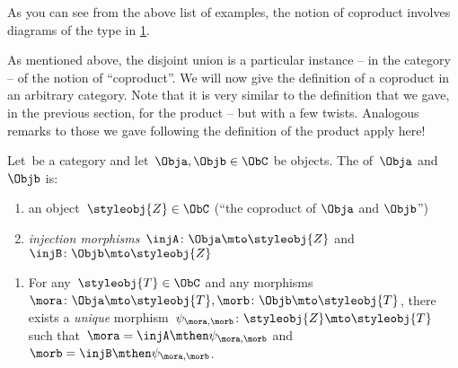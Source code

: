 
As you can see from the above list of examples, the notion of coproduct involves diagrams of the type in \cref{fig:coprod_generic}.

\begin{figure}[h!]
	\centering
	\caption{}
	\label{fig:coprod_generic}
\end{figure}

As mentioned above, the disjoint union is a particular instance -- in the category \Set  -- of the notion of ``coproduct''.
We will now give the definition of a coproduct in an arbitrary category.
Note that it is very similar to the definition that we gave, in the previous section, for the product -- but with a few twists.
Analogous remarks to those we gave following the definition of the product apply here!

\begin{ctdefinition}
	\label{def:catcoproduct}
	Let~\CatC be a category and let~$\Obja, \Objb \in \ObC$ be objects.
	The \emph{} of~$\Obja$ and~$\Objb$ is:  \\
	\constit
	\begin{enumerate}
		\item an object~$\styleobj{Z} \in \ObC$ (``the coproduct of $\Obja$ and $\Objb$'')
		\item \emph{injection morphisms}~$\injA \colon \Obja \mto \styleobj{Z} $ and~$\injB \colon \Objb \mto \styleobj{Z} $
	\end{enumerate}
	\condit
	\begin{enumerate}
		\item For any~$\styleobj{T} \in \ObC$ and any morphisms~$\mora \colon  \Obja \mto \styleobj{T}, \morb \colon \Objb \mto \styleobj{T}$, there exists a \emph{unique} morphism~$\psi_{\mora, \morb} \colon \styleobj{Z} \mto \styleobj{T}$ such that~$\mora = \injA\mthen \psi_{\mora, \morb}$ and~$\morb = \injB \mthen \psi_{\mora,\morb}$.
	\end{enumerate}
\end{ctdefinition}

